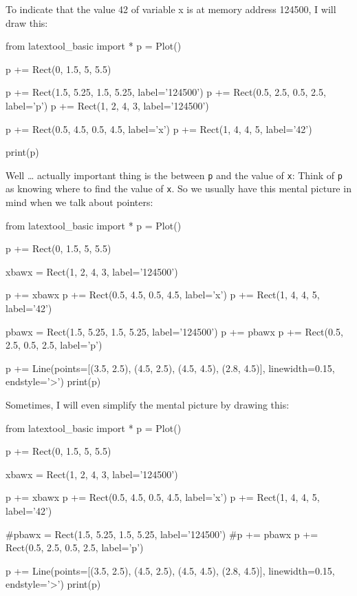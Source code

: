 To indicate that the value 42 of variable x is at memory address 124500,
I will draw this:

\begin{python}
from latextool_basic import *
p = Plot()

p += Rect(0, 1.5, 5, 5.5)

p += Rect(1.5, 5.25, 1.5, 5.25, label='124500')
p += Rect(0.5, 2.5, 0.5, 2.5, label='p')
p += Rect(1, 2, 4, 3, label='124500')

p += Rect(0.5, 4.5, 0.5, 4.5, label='x')
p += Rect(1, 4, 4, 5, label='42')

print(p)
\end{python}

Well \ldots{} actually important thing is the  between \texttt{p} and the value of \texttt{x}: Think of \texttt{p} as knowing where to find the value of \texttt{x}. So we usually have this mental picture in mind when we talk about pointers:

\begin{python}
from latextool_basic import *
p = Plot()

p += Rect(0, 1.5, 5, 5.5)

xbawx = Rect(1, 2, 4, 3, label='124500')

p += xbawx
p += Rect(0.5, 4.5, 0.5, 4.5, label='x')
p += Rect(1, 4, 4, 5, label='42')

pbawx = Rect(1.5, 5.25, 1.5, 5.25, label='124500')
p += pbawx
p += Rect(0.5, 2.5, 0.5, 2.5, label='p')

p += Line(points=[(3.5, 2.5), (4.5, 2.5), (4.5, 4.5), (2.8, 4.5)], linewidth=0.15, endstyle='>')
print(p)
\end{python}

Sometimes, I will even simplify the mental picture by drawing this:

\begin{python}
from latextool_basic import *
p = Plot()

p += Rect(0, 1.5, 5, 5.5)

xbawx = Rect(1, 2, 4, 3, label='124500')

p += xbawx
p += Rect(0.5, 4.5, 0.5, 4.5, label='x')
p += Rect(1, 4, 4, 5, label='42')

#pbawx = Rect(1.5, 5.25, 1.5, 5.25, label='124500')
#p += pbawx
p += Rect(0.5, 2.5, 0.5, 2.5, label='p')

p += Line(points=[(3.5, 2.5), (4.5, 2.5), (4.5, 4.5), (2.8, 4.5)], linewidth=0.15, endstyle='>')
print(p)
\end{python}

